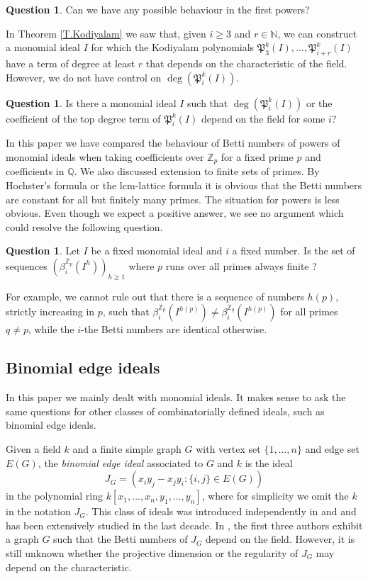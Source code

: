 \documentclass[11pt,oneside]{amsart}
\theoremstyle{plain}
\theoremstyle{definition}
\newtheorem{question}[theorem]{Question}
\newcommand{\Q}{\mathbb{Q}}
\newcommand{\Z}{\mathbb{Z}}
\newcommand{\N}{\mathbb{N}}
\begin{document}
\begin{question}
Can we have any possible behaviour in the first powers?
\end{question}

In Theorem \ref{T.Kodiyalam} we saw that, given $i \geq 3$ and $r \in \N$, we can construct a monomial ideal $I$ for which the Kodiyalam polynomials $\mathfrak P_3^k(I), \dots, \mathfrak P_{i+r}^k(I)$ have a term of degree at least $r$ that depends on the characteristic of the field. However, we do not have control on $\deg(\mathfrak P_i^k(I))$.

\begin{question}
Is there a monomial ideal $I$ such that $\deg(\mathfrak P_i^k(I))$ or the coefficient of the top degree term of $\mathfrak P_i^k(I)$ depend on the field for some $i$?
\end{question}

In this paper we have compared the behaviour of Betti numbers of 
powers of monomial ideals when
taking coefficients over $\Z_p$ for a fixed prime $p$ and coefficients in
$\Q$. We also discussed extension to finite sets of primes. 
By Hochster's formula or the lcm-lattice formula it is obvious 
that the Betti numbers are constant for all but finitely many primes.
The situation for powers is less obvious. Even though we expect a positive answer, we
see no argument which could resolve the following question.

\begin{question}
  Let $I$ be a fixed monomial ideal and $i$ a fixed number. Is the set of
  sequences $(\beta_i^{\Z_p}(I^h))_{h \geq 1}$ where $p$ runs over all
  primes always finite ?
\end{question}

For example, we cannot rule out that there is a sequence of numbers $h(p)$, strictly increasing in $p$, such that 
$\beta_i^{\Z_p}(I^{h(p)}) \neq \beta_i^{\Z_q}(I^{h(p)})$ for
all primes $q \neq p$, while the $i$-the Betti numbers are 
identical otherwise.

\subsection{Binomial edge ideals} \label{bei}

In this paper we mainly dealt with monomial ideals. It makes sense to ask the same questions for other classes of combinatorially defined ideals, such as binomial edge ideals.

Given a field $k$ and a finite simple graph $G$ with vertex set $\{1, \dots, n\}$ and edge set $E(G)$, the \textit{binomial edge ideal} associated to $G$ and $k$ is the ideal
\[
J_G = (x_i y_j - x_j y_i : \{i,j\} \in E(G) )
\]
in the polynomial ring $k[x_1, \dots, x_n, y_1, \dots, y_n]$, where for simplicity we omit the $k$ in the notation $J_G$.
This class of ideals was introduced independently in \cite{HHHKR10} and \cite{O11} and has been extensively studied in the last decade. In \cite[Example 7.6]{BMS21}, the first three authors exhibit a graph $G$ such that the Betti numbers of $J_G$ depend on the field. However, it is still unknown whether the projective dimension or the regularity of $J_G$ may depend on the characteristic. 
\end{document}
